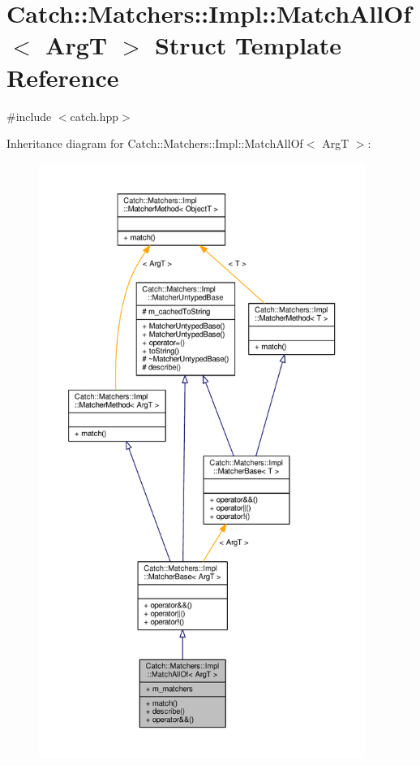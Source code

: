 \hypertarget{struct_catch_1_1_matchers_1_1_impl_1_1_match_all_of}{\section{Catch\-:\-:Matchers\-:\-:Impl\-:\-:Match\-All\-Of$<$ Arg\-T $>$ Struct Template Reference}
\label{struct_catch_1_1_matchers_1_1_impl_1_1_match_all_of}
}


{\ttfamily \#include $<$catch.\-hpp$>$}



Inheritance diagram for Catch\-:\-:Matchers\-:\-:Impl\-:\-:Match\-All\-Of$<$ Arg\-T $>$\-:
\nopagebreak
\begin{figure}[H]
\begin{center}
\leavevmode
\includegraphics[height=550pt]{struct_catch_1_1_matchers_1_1_impl_1_1_match_all_of__inherit__graph}
\end{center}
\end{figure}


